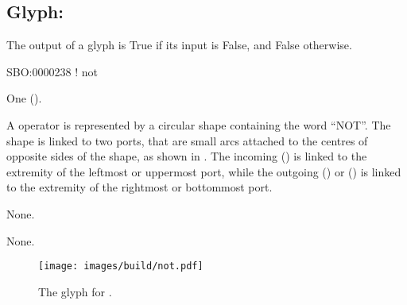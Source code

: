 \subsection{Glyph: }\label{sec:not}

The output of a  glyph is True if its input is False, and False otherwise.

\begin{glyphDescription}

\glyphSboTerm
SBO:0000238 ! not

\glyphIncoming One  ().

\glyphOutgoing

\glyphContainer
A  operator is represented by a circular shape containing the word ``NOT''.
The shape is linked to two ports, that are small arcs attached to the centres of opposite sides of the shape, as shown in .
The incoming  () is linked to the extremity of the leftmost or uppermost port, while the outgoing  () or  () is linked to the extremity of the rightmost or bottommost port.

\glyphLabel
None.

\glyphAux
None.

\end{glyphDescription}

\begin{figure}[H]
  \centering
  \texttt{[image: images/build/not.pdf]}
  \caption{The \PD glyph for .}
  \label{fig:not}
\end{figure}

